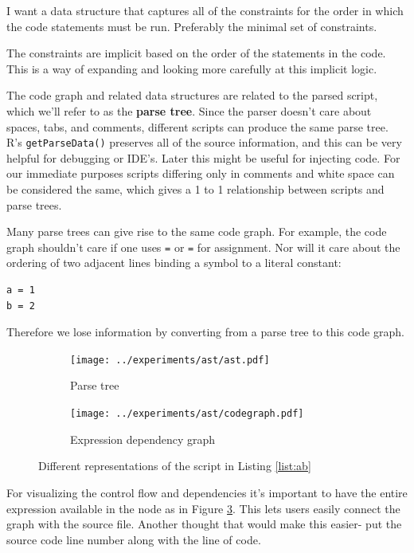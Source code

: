 \documentclass[12pt]{article}
\begin{document}
I want a data structure that captures all of the constraints for the order
in which the code statements must be run. Preferably the minimal
set of constraints.

The constraints are implicit based on the order of the statements in the
code. This is a way of expanding and looking more carefully at this
implicit logic.

The code graph and related data structures are related to the parsed
script, which we'll refer to as the \textbf{parse tree}. Since the parser
doesn't care about spaces, tabs, and comments,  different scripts can produce the same parse
tree. R's \texttt{getParseData()} preserves all of the source
information, and this can be very helpful for debugging or IDE's. Later
this might be useful for injecting code.
For our immediate purposes scripts differing only in comments and white space can be
considered the same, which gives a 1 to 1 relationship between scripts and
parse trees. 

Many parse trees can give rise to the same code graph. For
example, the code graph shouldn't care if one uses \texttt{=} or
\texttt{=} for assignment. Nor will it care about the ordering of two
adjacent lines binding a symbol to a literal constant:

\begin{verbatim}
a = 1
b = 2
\end{verbatim}

Therefore we lose information by converting from a parse tree to this code
graph.



\begin{figure}
\centering
\begin{subfigure}{.6\textwidth}
    \centering
    \texttt{[image: ../experiments/ast/ast.pdf]}
    \caption{Parse tree}
    \label{fig:ast}
\end{subfigure}%
\begin{subfigure}{.4\textwidth}
  \centering
  \texttt{[image: ../experiments/ast/codegraph.pdf]}
  \caption{Expression dependency graph}
  \label{fig:codegraph}
\end{subfigure}
\caption{Different representations of the script in Listing \ref{list:ab}}
\end{figure}

For visualizing the control flow and dependencies it's important to have the entire
expression available in the node as in Figure \ref{fig:codegraph}. This
lets users easily connect the graph with the source file. Another thought
that would make this easier- put the source code line number along with the
line of code.
\end{document}
